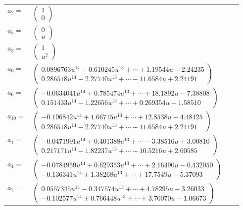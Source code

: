 \documentclass[1p]{elsarticle_modified}
\theoremstyle{definition}
\begin{document}
\begin{tabular}{m{7pt} m{180pt} m{7pt} m{180pt} }
\flushright $a_{2}=$&$\begin{pmatrix}1\\0\end{pmatrix}$ \\
\flushright $a_{5}=$&$\begin{pmatrix}0\\u\end{pmatrix}$ \\
\flushright $a_{3}=$&$\begin{pmatrix}1\\u^2\end{pmatrix}$ \\
\flushright $a_{9}=$&$\begin{pmatrix}0.0896763 u^{14}-0.610245 u^{13}+\cdots+1.19544 u-2.24235\\0.286518 u^{14}-2.27740 u^{13}+\cdots-11.6584 u+2.24191\end{pmatrix}$ \\
\flushright $a_{6}=$&$\begin{pmatrix}-0.0634041 u^{14}+0.785474 u^{13}+\cdots+18.1892 u-7.38808\\0.151433 u^{14}-1.22656 u^{13}+\cdots+0.269354 u-1.58510\end{pmatrix}$ \\
\flushright $a_{10}=$&$\begin{pmatrix}-0.196842 u^{14}+1.66715 u^{13}+\cdots+12.8538 u-4.48425\\0.286518 u^{14}-2.27740 u^{13}+\cdots-11.6584 u+2.24191\end{pmatrix}$ \\
\flushright $a_{1}=$&$\begin{pmatrix}-0.0471991 u^{14}+0.401388 u^{13}+\cdots-3.38516 u+3.00810\\0.217171 u^{14}-1.82237 u^{13}+\cdots-10.5216 u+2.60585\end{pmatrix}$ \\
\flushright $a_{4}=$&$\begin{pmatrix}-0.0784959 u^{14}+0.629353 u^{13}+\cdots+2.16490 u-0.432050\\-0.136341 u^{14}+1.38268 u^{13}+\cdots+17.7549 u-5.37093\end{pmatrix}$ \\
\flushright $a_{7}=$&$\begin{pmatrix}0.0557345 u^{14}-0.347574 u^{13}+\cdots+4.78295 u-3.26033\\-0.102577 u^{14}+0.766448 u^{13}+\cdots+3.70070 u-1.06673\end{pmatrix}$ \\

\end{tabular}
\end{document}
